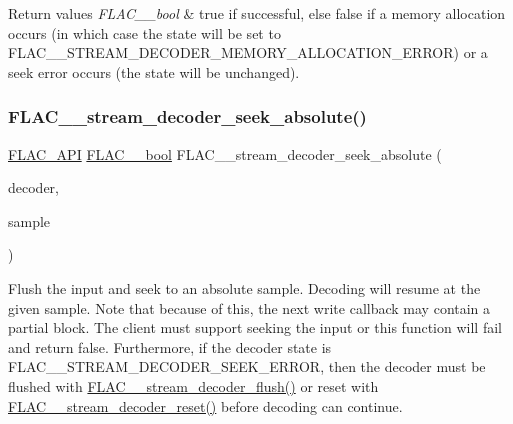 \begin{DoxyRetVals}{Return values}
{\em F\+L\+A\+C\+\_\+\+\_\+bool} & {\ttfamily true} if successful, else {\ttfamily false} if a memory allocation occurs (in which case the state will be set to {\ttfamily F\+L\+A\+C\+\_\+\+\_\+\+S\+T\+R\+E\+A\+M\+\_\+\+D\+E\+C\+O\+D\+E\+R\+\_\+\+M\+E\+M\+O\+R\+Y\+\_\+\+A\+L\+L\+O\+C\+A\+T\+I\+O\+N\+\_\+\+E\+R\+R\+OR}) or a seek error occurs (the state will be unchanged). \\
\hline
\end{DoxyRetVals}
\mbox{\label{group__flac__stream__decoder_ga5c1c70de72e6ed49db6d61a9131d9117}} 
\subsubsection{\texorpdfstring{F\+L\+A\+C\+\_\+\+\_\+stream\+\_\+decoder\+\_\+seek\+\_\+absolute()}{FLAC\_\_stream\_decoder\_seek\_absolute()}}
{\footnotesize\ttfamily \hyperlink{group__flac__export_ga56ca07df8a23310707732b1c0007d6f5}{F\+L\+A\+C\+\_\+\+A\+PI} \hyperlink{ordinals_8h_a95103469f1cbd78b8cf250194985b34e}{F\+L\+A\+C\+\_\+\+\_\+bool} F\+L\+A\+C\+\_\+\+\_\+stream\+\_\+decoder\+\_\+seek\+\_\+absolute (\begin{DoxyParamCaption}\item[{\hyperlink{struct_f_l_a_c_____stream_decoder}{F\+L\+A\+C\+\_\+\+\_\+\+Stream\+Decoder} $\ast$}]{decoder,  }\item[{\hyperlink{ordinals_8h_aa78c8c70a3eb8a58af7436f278acde8e}{F\+L\+A\+C\+\_\+\+\_\+uint64}}]{sample }\end{DoxyParamCaption})}

Flush the input and seek to an absolute sample. Decoding will resume at the given sample. Note that because of this, the next write callback may contain a partial block. The client must support seeking the input or this function will fail and return {\ttfamily false}. Furthermore, if the decoder state is {\ttfamily F\+L\+A\+C\+\_\+\+\_\+\+S\+T\+R\+E\+A\+M\+\_\+\+D\+E\+C\+O\+D\+E\+R\+\_\+\+S\+E\+E\+K\+\_\+\+E\+R\+R\+OR}, then the decoder must be flushed with \hyperlink{group__flac__stream__decoder_ga0109ce87f2c648b224b68c08b3c090cb}{F\+L\+A\+C\+\_\+\+\_\+stream\+\_\+decoder\+\_\+flush()} or reset with \hyperlink{group__flac__stream__decoder_ga2342cf4f3caf9ad20fca1373aaea0c27}{F\+L\+A\+C\+\_\+\+\_\+stream\+\_\+decoder\+\_\+reset()} before decoding can continue.


